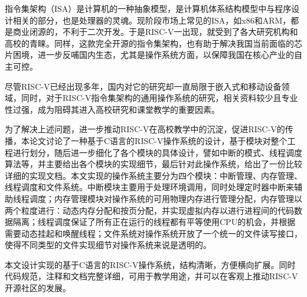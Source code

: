 \begin{cabstract}

指令集架构（ISA）是计算机的一种抽象模型，是计算机体系结构模型中与程序设计相关的部分，也是处理器的灵魂。现阶段市场上常见的ISA，如x86和ARM，都是商业闭源的，不利于二次开发。于是RISC-V一出现，就受到了各大研究机构和高校的青睐。同样，这款完全开源的指令集架构，也有助于解决我国当前面临的芯片困境，进一步反哺国内生态，尤其是操作系统方面，以保障我国在核心产业的自主可控。

尽管RISC-V已经出现多年，国内对它的研究却一直局限于嵌入式和移动设备领域，同时，对于RISC-V指令集架构的通用操作系统的研究，相关资料较少且专业性过强，成为阻碍其进入高校研究和课堂教学的重要因素。

为了解决上述问题，进一步推动RISC-V在高校教学中的沉淀，促进RISC-V的传播，本论文讨论了一种基于C语言的RISC-V操作系统的设计，基于模块对整个工程进行划分，随后进一步细化了各个模块的具体设计，譬如中断的模式、线程调度算法等，并主要给出各个模块的实现细节，最后针对此操作系统，给出了一份比较详细的实现文档。本文实现的操作系统主要分为四个模块：中断管理、内存管理、线程调度和文件系统。中断模块主要用于处理环境调用，同时处理定时器中断来辅助线程调度；内存管理模块对操作系统的可用物理内存进行管理分配，内存管理以两个粒度进行：动态内存分配和按页分配，并实现虚拟内存以进行进程间的代码数据隔离；线程调度保证了所有正在运行的线程都有平等使用CPU的机会，并根据需要动态挂起和唤醒线程；文件系统对操作系统开放了一个统一的文件读写接口，使得不同类型的文件实现细节对操作系统来说是透明的。

本文设计实现的基于C语言的RISC-V操作系统，结构清晰，方便横向扩展。同时代码规范，注释和文档完整详细，可用于教学用途，并可以在客观上推动RISC-V开源社区的发展。

\end{cabstract}

